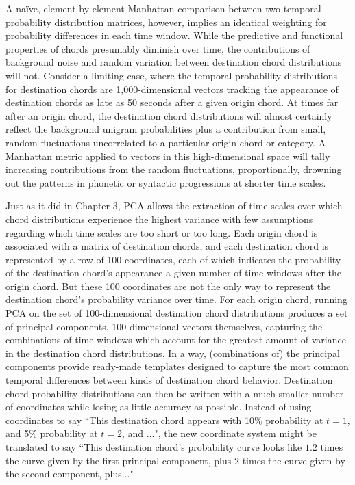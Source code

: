 A na\"{i}ve, element-by-element Manhattan comparison between two temporal probability distribution matrices, however, implies an identical weighting for probability differences in each time window.  While the predictive and functional properties of chords presumably diminish over time, the contributions of background noise and random variation between destination chord distributions will not.  Consider a limiting case, where the temporal probability distributions for destination chords are 1,000-dimensional vectors tracking the appearance of destination chords as late as 50 seconds after a given origin chord.  At times far after an origin chord, the destination chord distributions will almost certainly reflect the background unigram probabilities plus a contribution from small, random fluctuations uncorrelated to a particular origin chord or category.  A Manhattan metric applied to vectors in this high-dimensional space will tally increasing contributions from the random fluctuations, proportionally, drowning out the patterns in phonetic or syntactic progressions at shorter time scales.

Just as it did in Chapter 3, PCA allows the extraction of time scales over which chord distributions experience the highest variance with few assumptions regarding which time scales are too short or too long.  Each origin chord is associated with a matrix of destination chords, and each destination chord is represented by a row of 100 coordinates, each of which indicates the probability of the destination chord's appearance a given number of time windows after the origin chord.  But these 100 coordinates are not the only way to represent the destination chord's probability variance over time.  For each origin chord, running PCA on the set of 100-dimensional destination chord distributions produces a set of principal components, 100-dimensional vectors themselves, capturing the combinations of time windows which account for the greatest amount of variance in the destination chord distributions.  In a way, (combinations of) the principal components provide ready-made templates designed to capture the most common temporal differences between kinds of destination chord behavior.  Destination chord probability distributions can then be written with a much smaller number of coordinates while losing as little accuracy as possible.  Instead of using coordinates to say ``This destination chord appears with 10\% probability at $t=1$, and 5\% probability at $t=2$, and ...", the new coordinate system might be translated to say ``This destination chord's probability curve looks like $1.2$ times the curve given by the first principal component, plus $2$ times the curve given by the second component, plus..."

